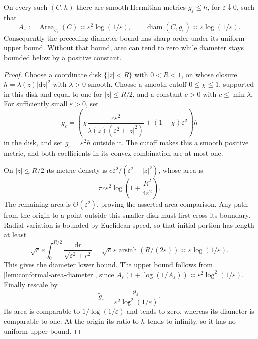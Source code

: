 \begin{example}\label{ex:conformal-log-diameter-sharpness}
On every such $(C,h)$ there are smooth Hermitian metrics $g_\varepsilon\leq h$, for $\varepsilon\downarrow0$, such that
\[
 A_\varepsilon:=\operatorname{Area}_{g_\varepsilon}(C)
       \asymp\varepsilon^2\log(1/\varepsilon),
 \qquad
 \operatorname{diam}(C,g_\varepsilon)
       \asymp\varepsilon\log(1/\varepsilon).
\]
Consequently the preceding diameter bound has sharp order under its uniform upper bound. Without that bound, area can tend to zero while diameter stays bounded below by a positive constant.
\end{example}
\begin{proof}
Choose a coordinate disk $\{|z|<R\}$ with $0<R<1$, on whose closure $h=\lambda(z)|\mathrm{d}z|^2$ with $\lambda>0$ smooth. Choose a smooth cutoff $0\leq\chi\leq1$, supported in this disk and equal to one for $|z|\leq R/2$, and a constant $c>0$ with $c\leq\min\lambda$. For sufficiently small $\varepsilon>0$, set
\[
 g_\varepsilon=
 \left(\chi\frac{c\varepsilon^2}{\lambda(z)(\varepsilon^2+|z|^2)}
             +(1-\chi)\varepsilon^2\right)h
\]
in the disk, and set $g_\varepsilon=\varepsilon^2h$ outside it. The cutoff makes this a smooth positive metric, and both coefficients in its convex combination are at most one.

On $|z|\leq R/2$ its metric density is $c\varepsilon^2/(\varepsilon^2+|z|^2)$, whose area is
\[
 \pi c\varepsilon^2
       \log\left(1+\frac{R^2}{4\varepsilon^2}\right).
\]
The remaining area is $O(\varepsilon^2)$, proving the asserted area comparison. Any path from the origin to a point outside this smaller disk must first cross its boundary. Radial variation is bounded by Euclidean speed, so that initial portion has length at least
\[
 \sqrt c\,\varepsilon\int_0^{R/2}
                 \frac{\mathrm{d}r}{\sqrt{\varepsilon^2+r^2}}
       =\sqrt c\,\varepsilon\operatorname{arsinh}(R/(2\varepsilon))
       \asymp\varepsilon\log(1/\varepsilon).
\]
This gives the diameter lower bound. The upper bound follows from \cref{lem:conformal-area-diameter}, since $A_\varepsilon(1+\log(1/A_\varepsilon))\asymp\varepsilon^2\log^2(1/\varepsilon)$. Finally rescale by
\[
 \widetilde g_\varepsilon
       =\frac{g_\varepsilon}{\varepsilon^2\log^2(1/\varepsilon)}.
\]
Its area is comparable to $1/\log(1/\varepsilon)$ and tends to zero, whereas its diameter is comparable to one. At the origin its ratio to $h$ tends to infinity, so it has no uniform upper bound.
\end{proof}

